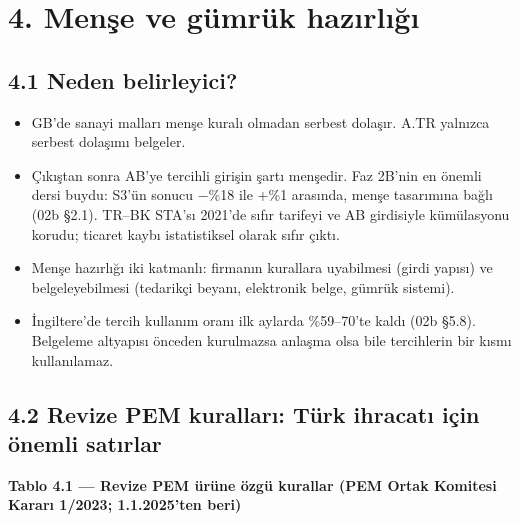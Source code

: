 \endgroup

\hypertarget{02c_hazirlik-4-menux15fe-ve-guxfcmruxfck-hazux131rlux131ux11fux131}{%
\section{4. Menşe ve gümrük hazırlığı}\label{02c_hazirlik-4-menux15fe-ve-guxfcmruxfck-hazux131rlux131ux11fux131}}

\hypertarget{02c_hazirlik-41-neden-belirleyici}{%
\subsection{4.1 Neden belirleyici?}\label{02c_hazirlik-41-neden-belirleyici}}

\begin{itemize}
\tightlist
\item
  GB'de sanayi malları menşe kuralı olmadan serbest dolaşır. A.TR yalnızca serbest dolaşımı belgeler.
\item
  Çıkıştan sonra AB'ye tercihli girişin şartı menşedir. Faz 2B'nin en önemli dersi buydu: S3'ün sonucu −\%18 ile +\%1 arasında, menşe tasarımına bağlı (02b §2.1). TR--BK STA'sı 2021'de sıfır tarifeyi ve AB girdisiyle kümülasyonu korudu; ticaret kaybı istatistiksel olarak sıfır çıktı.
\item
  Menşe hazırlığı iki katmanlı: firmanın kurallara uyabilmesi (girdi yapısı) ve belgeleyebilmesi (tedarikçi beyanı, elektronik belge, gümrük sistemi).
\item
  İngiltere'de tercih kullanım oranı ilk aylarda \%59--70'te kaldı (02b §5.8). Belgeleme altyapısı önceden kurulmazsa anlaşma olsa bile tercihlerin bir kısmı kullanılamaz.
\end{itemize}

\hypertarget{02c_hazirlik-42-revize-pem-kurallarux131-tuxfcrk-ihracatux131-iuxe7in-uxf6nemli-satux131rlar}{%
\subsection{4.2 Revize PEM kuralları: Türk ihracatı için önemli satırlar}\label{02c_hazirlik-42-revize-pem-kurallarux131-tuxfcrk-ihracatux131-iuxe7in-uxf6nemli-satux131rlar}}


\textbf{Tablo 4.1 --- Revize PEM ürüne özgü kurallar (PEM Ortak Komitesi Kararı 1/2023; 1.1.2025'ten beri)}

\nopagebreak[4]

\begingroup\gbtablo\small

